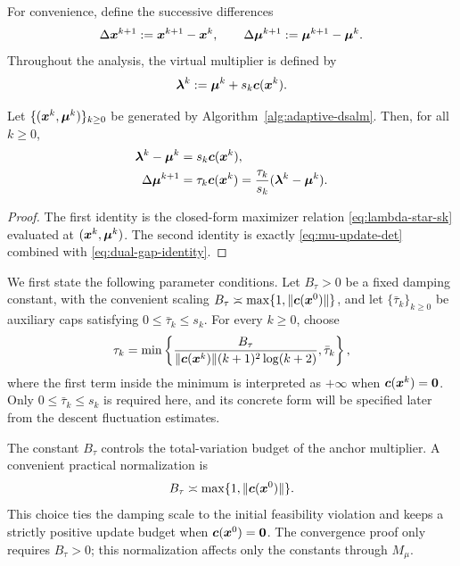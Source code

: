 \documentclass[10pt]{article}
\begin{document}
For convenience, define the successive differences
\[
    \Delta\bm{x}^{k+1}:=\bm{x}^{k+1}-\bm{x}^k,
    \qquad
    \Delta\bm{\mu}^{k+1}:=\bm{\mu}^{k+1}-\bm{\mu}^k.
\]
Throughout the analysis, the virtual multiplier is defined by
\[
    \bm{\lambda}^k:=\bm{\mu}^k+s_k\bm{c}(\bm{x}^k).
\]

\begin{lemma}
\label{lem:basic-dual-relations}
Let $\{(\bm{x}^k,\bm{\mu}^k)\}_{k\ge 0}$ be generated by
Algorithm~\ref{alg:adaptive-dsalm}.
Then, for all $k\ge0$,
\begin{align}
    \bm{\lambda}^k-\bm{\mu}^k
    &=
    s_k\bm{c}(\bm{x}^k),
    \label{eq:dual-gap-identity}\\
    \Delta\bm{\mu}^{k+1}
    &=
    \tau_k\bm{c}(\bm{x}^k)
    =
    \frac{\tau_k}{s_k}(\bm{\lambda}^k-\bm{\mu}^k).
    \label{eq:mu-drift-tau}
\end{align}
\end{lemma}

\begin{proof}
The first identity is the closed-form maximizer relation
\eqref{eq:lambda-star-sk} evaluated at $(\bm{x}^k,\bm{\mu}^k)$.  The second identity
is exactly \eqref{eq:mu-update-det} combined with
\eqref{eq:dual-gap-identity}.
\end{proof}

We first state the following parameter conditions.  Let $B_\tau>0$ be a
fixed damping constant, with the convenient scaling
$B_\tau\asymp\max\{1,\|\bm{c}(\bm{x}^0)\|\}$, and let
$\{\bar\tau_k\}_{k\ge0}$ be auxiliary caps satisfying
$0\le \bar\tau_k\le s_k$.  For every $k\ge0$, choose
\begin{equation}
\label{eq:adaptive-anchor-stepsize}
    \tau_k
    =
    \min\left\{
    \frac{B_\tau}
    {\|\bm{c}(\bm{x}^k)\|(k+1)^2\log(k+2)},
    \bar\tau_k
    \right\},
\end{equation}
where the first term inside the minimum is interpreted as $+\infty$ when
$\bm{c}(\bm{x}^k)=\bm{0}$.  Only $0\le\bar\tau_k\le s_k$ is required here, and its
concrete form will be specified later from the descent fluctuation estimates.

\begin{remark}
The constant $B_\tau$ controls the total-variation budget of the anchor
multiplier.  A convenient practical normalization is
\[
    B_\tau
    \asymp
    \max\{1,\|\bm{c}(\bm{x}^0)\|\}.
\]
This choice ties the damping scale to the initial feasibility violation and
keeps a strictly positive update budget when $\bm{c}(\bm{x}^0)=\bm{0}$.  The
convergence proof only requires $B_\tau>0$; this normalization affects only
the constants through $M_\mu$.
\end{remark}
\end{document}
